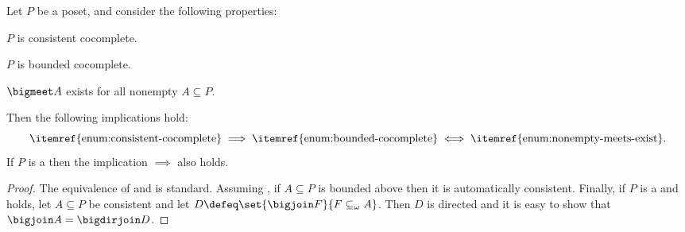 \begin{lemma}
    \label{lem:poset-completeness-equivalence}
    Let $P$ be a poset, and consider the following properties:
    \begin{enumlemma}
        \item\label{enum:consistent-cocomplete} $P$ is consistent cocomplete.
        \item\label{enum:bounded-cocomplete} $P$ is bounded cocomplete.
        \item\label{enum:nonempty-meets-exist} $\bigmeet A$ exists for all nonempty $A \subseteq P$.
    \end{enumlemma}
    Then the following implications hold:
    \begin{equation*}
        \text{\itemref{enum:consistent-cocomplete}}
            \implies \text{\itemref{enum:bounded-cocomplete}}
            \iff \text{\itemref{enum:nonempty-meets-exist}}.
    \end{equation*}
    If $P$ is a \dCPO{} then the implication  $\implies$  also holds.
\end{lemma}

\begin{proof}
    The equivalence of  and  is standard. Assuming , if $A \subseteq P$ is bounded above then it is automatically consistent. Finally, if $P$ is a \dCPO{} and  holds, let $A \subseteq P$ be consistent and let $D \defeq \set{\bigjoin F}{F \subseteq_\omega A}$. Then $D$ is directed and it is easy to show that $\bigjoin A = \bigdirjoin D$.
\end{proof}






